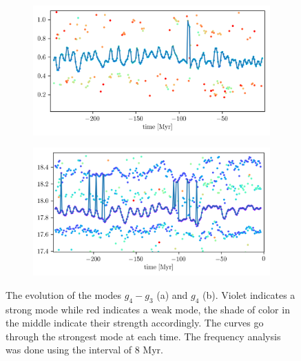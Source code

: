 \documentclass[12pt]{article}
\begin{document}
	\begin{figure}[t]
		\centering
		\begin{subfigure}[t]{0.55\textwidth}
			\includegraphics[width=1.0\textwidth,height=0.20\textheight]{figures/e_2004}%
			\caption{}
			\label{fig:2004a}
		\end{subfigure}%
		\begin{subfigure}[t]{0.55\textwidth}
			\centering
			\includegraphics[width=1.0\textwidth,height=0.20\textheight]{figures/g4_2004}%
			\caption{}
			\label{fig:2004b}
		\end{subfigure}
		\caption{The evolution of the modes $g_4 - g_3$ (a) and $g_4$ (b). Violet indicates a strong mode while red indicates a weak mode, the shade of color in the middle indicate their strength accordingly. The curves go through the strongest mode at each time. The frequency analysis was done using the interval of 8 Myr. }
		\label{fig:2004}
	\end{figure}
\end{document}

